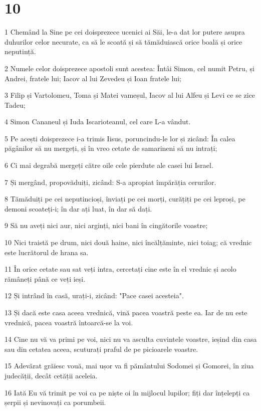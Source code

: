 \chapter{10}

\par 1 Chemând la Sine pe cei doisprezece ucenici ai Săi, le-a dat lor putere asupra duhurilor celor necurate, ca să le scoată și să tămăduiască orice boală și orice neputință.
\par 2 Numele celor doisprezece apostoli sunt acestea: Întâi Simon, cel numit Petru, și Andrei, fratele lui; Iacov al lui Zevedeu și Ioan fratele lui;
\par 3 Filip și Vartolomeu, Toma și Matei vameșul, Iacov al lui Alfeu și Levi ce se zice Tadeu;
\par 4 Simon Cananeul și Iuda Iscarioteanul, cel care L-a vândut.
\par 5 Pe acești doisprezece i-a trimis Iisus, poruncindu-le lor și zicând: În calea păgânilor să nu mergeți, și în vreo cetate de samarineni să nu intrați;
\par 6 Ci mai degrabă mergeți către oile cele pierdute ale casei lui Israel.
\par 7 Și mergând, propovăduiți, zicând: S-a apropiat împărăția cerurilor.
\par 8 Tămăduiți pe cei neputincioși, înviați pe cei morți, curățiți pe cei leproși, pe demoni scoateți-i; în dar ați luat, în dar să dați.
\par 9 Să nu aveți nici aur, nici arginți, nici bani în cingătorile voastre;
\par 10 Nici traistă pe drum, nici două haine, nici încălțăminte, nici toiag; că vrednic este lucrătorul de hrana sa.
\par 11 În orice cetate sau sat veți intra, cercetați cine este în el vrednic și acolo rămâneți până ce veți ieși.
\par 12 Și intrând în casă, urați-i, zicând: "Pace casei acesteia".
\par 13 Și dacă este casa aceea vrednică, vină pacea voastră peste ea. Iar de nu este vrednică, pacea voastră întoarcă-se la voi.
\par 14 Cine nu vă va primi pe voi, nici nu va asculta cuvintele voastre, ieșind din casa sau din cetatea aceea, scuturați praful de pe picioarele voastre.
\par 15 Adevărat grăiesc vouă, mai ușor va fi pământului Sodomei și Gomorei, în ziua judecății, decât cetății aceleia.
\par 16 Iată Eu vă trimit pe voi ca pe niște oi în mijlocul lupilor; fiți dar înțelepți ca șerpii și nevinovați ca porumbeii.
